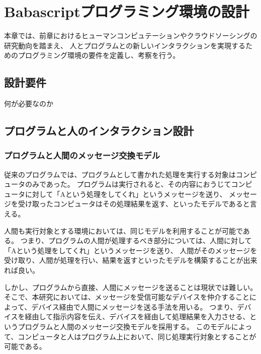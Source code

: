 \chapter{Babascriptプログラミング環境の設計}
\label{chap:design}

本章では、前章におけるヒューマンコンピュテーションやクラウドソーシングの研究動向を踏まえ、
人とプログラムとの新しいインタラクションを実現するためのプログラミング環境の要件を定義し、考察を行う。

\section{設計要件}\label{ux8a2dux8a08ux8981ux4ef6}

何が必要なのか

\section{プログラムと人のインタラクション設計}\label{ux30d7ux30edux30b0ux30e9ux30e0ux3068ux4ebaux306eux30a4ux30f3ux30bfux30e9ux30afux30b7ux30e7ux30f3ux8a2dux8a08}

\subsection{プログラムと人間のメッセージ交換モデル}\label{ux30d7ux30edux30b0ux30e9ux30e0ux3068ux4ebaux9593ux306eux30e1ux30c3ux30bbux30fcux30b8ux4ea4ux63dbux30e2ux30c7ux30eb}

従来のプログラムでは、プログラムとして書かれた処理を実行する対象はコンピュータのみであった。
プログラムは実行されると、その内容におうじてコンピュータに対して「Aという処理をしてくれ」というメッセージを送り、
メッセージを受け取ったコンピュータはその処理結果を返す、といったモデルであると言える。

人間も実行対象とする環境においては、同じモデルを利用することが可能である。
つまり、プログラムの人間が処理するべき部分については、人間に対して「Aという処理をしてくれ」というメッセージを送り、
人間がそのメッセージを受け取り、人間が処理を行い、結果を返すといったモデルを構築することが出来れば良い。

しかし、プログラムから直接、人間にメッセージを送ることは現状では難しい。
そこで、本研究においては、メッセージを受信可能なデバイスを仲介することによって、デバイス経由で人間にメッセージを送る手法を用いる。
つまり、デバイスを経由して指示内容を伝え、デバイスを経由して処理結果を入力させる、というプログラムと人間のメッセージ交換モデルを採用する。
このモデルによって、コンピュータと人はプログラム上において、同じ処理実行対象とすることが可能である。


